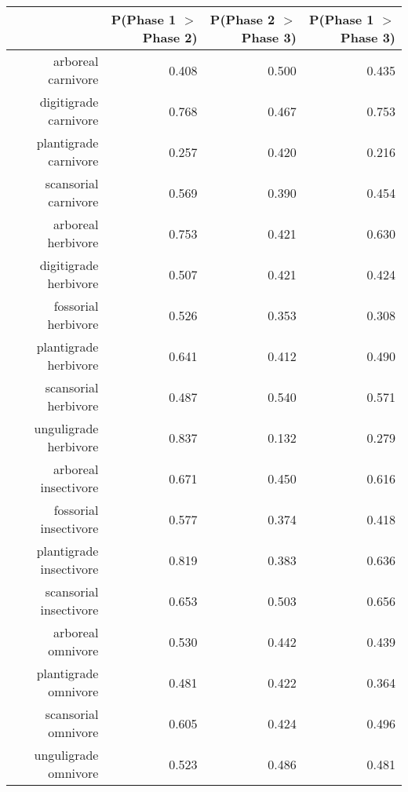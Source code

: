 \begin{table}[ht]
\centering
\begin{tabular}{rrrr}
  \hline
 & P(Phase 1 $>$ Phase 2) & P(Phase 2 $>$ Phase 3) & P(Phase 1 $>$ Phase 3) \\ 
  \hline
arboreal carnivore & 0.408 & 0.500 & 0.435 \\ 
  digitigrade carnivore & 0.768 & 0.467 & 0.753 \\ 
  plantigrade carnivore & 0.257 & 0.420 & 0.216 \\ 
  scansorial carnivore & 0.569 & 0.390 & 0.454 \\ 
  arboreal herbivore & 0.753 & 0.421 & 0.630 \\ 
  digitigrade herbivore & 0.507 & 0.421 & 0.424 \\ 
  fossorial herbivore & 0.526 & 0.353 & 0.308 \\ 
  plantigrade herbivore & 0.641 & 0.412 & 0.490 \\ 
  scansorial herbivore & 0.487 & 0.540 & 0.571 \\ 
  unguligrade herbivore & 0.837 & 0.132 & 0.279 \\ 
  arboreal insectivore & 0.671 & 0.450 & 0.616 \\ 
  fossorial insectivore & 0.577 & 0.374 & 0.418 \\ 
  plantigrade insectivore & 0.819 & 0.383 & 0.636 \\ 
  scansorial insectivore & 0.653 & 0.503 & 0.656 \\ 
  arboreal omnivore & 0.530 & 0.442 & 0.439 \\ 
  plantigrade omnivore & 0.481 & 0.422 & 0.364 \\ 
  scansorial omnivore & 0.605 & 0.424 & 0.496 \\ 
  unguligrade omnivore & 0.523 & 0.486 & 0.481 \\ 
   \hline
\end{tabular}
\label{tab:surv_plant}
\end{table}
